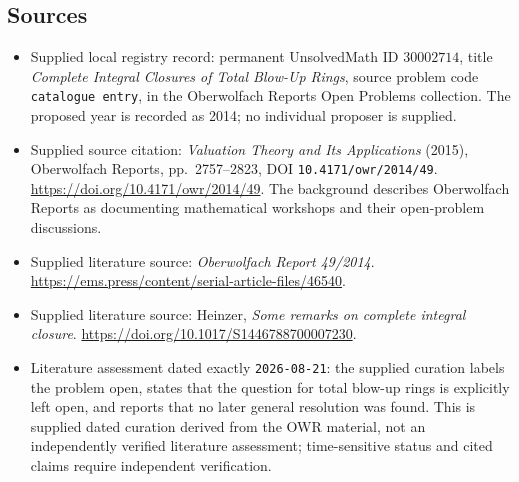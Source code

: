 \documentclass[11pt]{article}
\begin{document}
\subsection{Sources}
\begin{itemize}
\item Supplied local registry record: permanent UnsolvedMath ID \(30002714\), title \emph{Complete Integral Closures of Total Blow-Up Rings}, source problem code \texttt{catalogue entry}, in the Oberwolfach Reports Open Problems collection. The proposed year is recorded as 2014; no individual proposer is supplied.
\item Supplied source citation: \emph{Valuation Theory and Its Applications} (2015), Oberwolfach Reports, pp.\ 2757--2823, DOI \texttt{10.4171/owr/2014/49}. \url{https://doi.org/10.4171/owr/2014/49}. The background describes Oberwolfach Reports as documenting mathematical workshops and their open-problem discussions.
\item Supplied literature source: \emph{Oberwolfach Report 49/2014}. \url{https://ems.press/content/serial-article-files/46540}.
\item Supplied literature source: Heinzer, \emph{Some remarks on complete integral closure}. \url{https://doi.org/10.1017/S1446788700007230}.
\item Literature assessment dated exactly \texttt{2026-08-21}: the supplied curation labels the problem open, states that the question for total blow-up rings is explicitly left open, and reports that no later general resolution was found. This is supplied dated curation derived from the OWR material, not an independently verified literature assessment; time-sensitive status and cited claims require independent verification.
\end{itemize}
\end{document}

